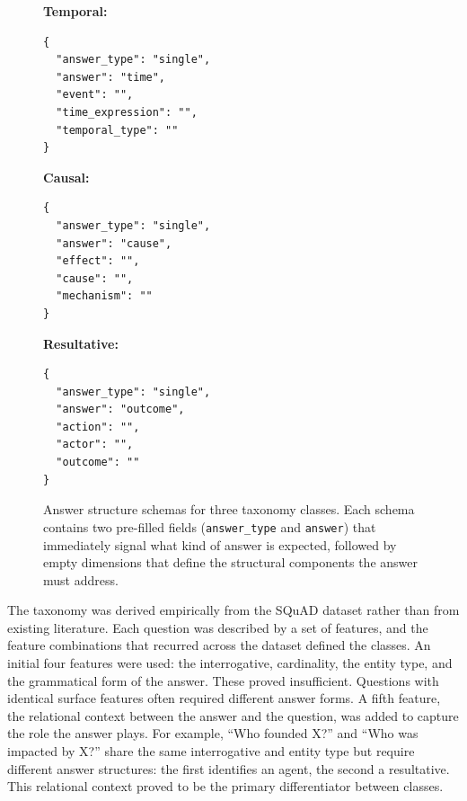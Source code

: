\documentclass[master]{thesis}
\begin{document}
\begin{figure}[ht]
\centering
\begin{minipage}[t]{0.30\textwidth}
\textbf{Temporal:}
\begin{verbatim}
{
  "answer_type": "single",
  "answer": "time",
  "event": "",
  "time_expression": "",
  "temporal_type": ""
}
\end{verbatim}
\end{minipage}
\hfill
\begin{minipage}[t]{0.30\textwidth}
\textbf{Causal:}
\begin{verbatim}
{
  "answer_type": "single",
  "answer": "cause",
  "effect": "",
  "cause": "",
  "mechanism": ""
}
\end{verbatim}
\end{minipage}
\hfill
\begin{minipage}[t]{0.30\textwidth}
\textbf{Resultative:}
\begin{verbatim}
{
  "answer_type": "single",
  "answer": "outcome",
  "action": "",
  "actor": "",
  "outcome": ""
}
\end{verbatim}
\end{minipage}
\caption{Answer structure schemas for three taxonomy classes. Each schema contains two pre-filled fields (\texttt{answer\_type} and \texttt{answer}) that immediately signal what kind of answer is expected, followed by empty dimensions that define the structural components the answer must address.}
\label{fig:taxonomy_schemas}
\end{figure}

The taxonomy was derived empirically from the SQuAD dataset rather than from existing literature. Each question was described by a set of features, and the feature combinations that recurred across the dataset defined the classes. An initial four features were used: the interrogative, cardinality, the entity type, and the grammatical form of the answer. These proved insufficient. Questions with identical surface features often required different answer forms. A fifth feature, the relational context between the answer and the question, was added to capture the role the answer plays. For example, ``Who founded X?'' and ``Who was impacted by X?'' share the same interrogative and entity type but require different answer structures: the first identifies an agent, the second a resultative. This relational context proved to be the primary differentiator between classes.
\end{document}
